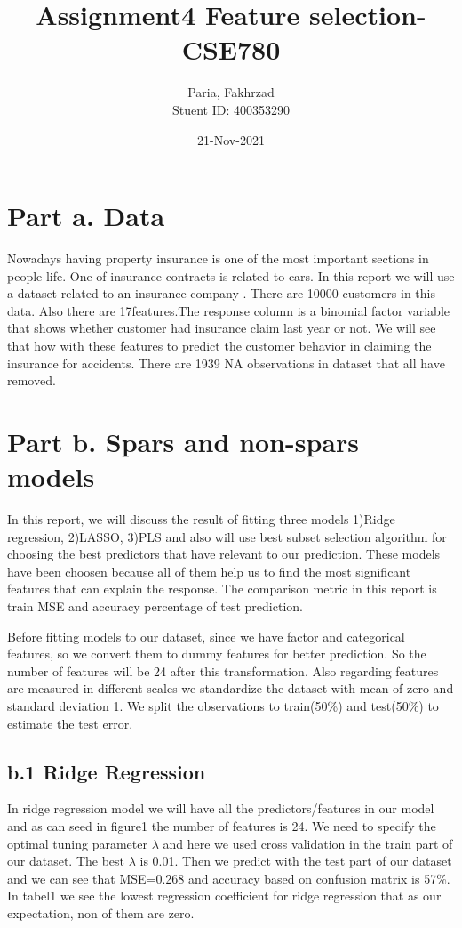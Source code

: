 \documentclass[a4paper, 11pt]{article}
\title{Assignment4 Feature selection-CSE780}
\author{Paria, Fakhrzad \\ Stuent ID: 400353290 }
\date{21-Nov-2021}
\begin{document}
	\maketitle
	\newpage
\section*{Part a. Data}
Nowadays having property insurance is one of the most important sections in people life. One of insurance contracts is related  to cars. In this report we will use a dataset related to an insurance company \cite{Kaggle}. There are 10000 customers in this data. Also there are 17features.The response column is a binomial factor variable that shows whether customer had insurance claim last year or not. We will see that how with these features to predict the customer behavior in claiming the insurance for accidents.\newline
There are 1939 NA observations in dataset that all have removed.\newline
\section*{Part b. Spars and non-spars models}
In this report, we will discuss the result of fitting three models 1)Ridge regression,  2)LASSO,  3)PLS and also will use best subset selection algorithm for choosing the best predictors that have relevant to our prediction.
These models have been choosen because all of them help us to find the most significant features that can explain the response. The comparison metric in this report is train MSE and accuracy percentage of test prediction.
 
Before fitting models to our dataset, since we have factor and categorical features, so we convert them to dummy features for better prediction. So the number of features will be 24 after this transformation. Also regarding features are measured in different scales we standardize the dataset with mean of zero and standard deviation 1.
We split the observations to train(50\%) and test(50\%) to estimate the test error.
\newline
\subsection*{b.1 Ridge Regression}
In ridge regression model we will have all the predictors/features in our model and as can seed in figure1 the number of features is 24.  We need to specify the optimal tuning parameter $\lambda$ and here we used cross validation in the train part of our dataset. The best $\lambda$ is 0.01. Then we predict with the test part of our dataset and we can see that MSE=0.268 and accuracy based on confusion matrix is 57\%. In tabel1 we see the lowest regression coefficient for ridge regression that as our expectation, non of them are zero.
\end{document}

